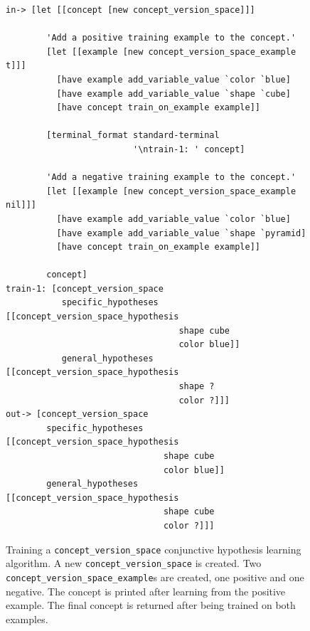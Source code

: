 \begin{figure}[h]
\centering
{\scriptsize
\begin{Verbatim}[frame=single]
 in-> [let [[concept [new concept_version_space]]]
   
        'Add a positive training example to the concept.'
        [let [[example [new concept_version_space_example t]]]
          [have example add_variable_value `color `blue]
          [have example add_variable_value `shape `cube]
          [have concept train_on_example example]]

        [terminal_format standard-terminal
                         '\ntrain-1: ' concept]
        
        'Add a negative training example to the concept.'
        [let [[example [new concept_version_space_example nil]]]
          [have example add_variable_value `color `blue]
          [have example add_variable_value `shape `pyramid]
          [have concept train_on_example example]]
        
        concept]
train-1: [concept_version_space
           specific_hypotheses [[concept_version_space_hypothesis
                                  shape cube
                                  color blue]]
           general_hypotheses  [[concept_version_space_hypothesis
                                  shape ?
                                  color ?]]]
out-> [concept_version_space
        specific_hypotheses [[concept_version_space_hypothesis
                               shape cube
                               color blue]]
        general_hypotheses  [[concept_version_space_hypothesis
                               shape cube
                               color ?]]]
\end{Verbatim}
}
\caption[Training a {\tt{concept\_version\_space}} conjunctive
  hypothesis learning algorithm.]{Training a
  {\tt{concept\_version\_space}} conjunctive hypothesis learning
  algorithm.  A new {\tt{concept\_version\_space}} is created.  Two
  {\tt{concept\_version\_space\_example}}s are created, one positive
  and one negative.  The concept is printed after learning from the
  positive example.  The final concept is returned after being trained
  on both examples.}
\label{figure:concept_version_space_training}
\end{figure}
